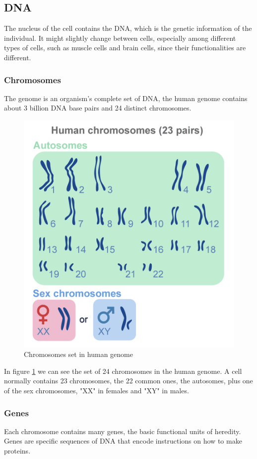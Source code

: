 \subsection{DNA}
The nucleus of the cell contains the DNA, which is the genetic information of the individual. It might slightly change between cells, especially among different types of cells, such as muscle cells and brain cells, since their functionalities are different.
\subsubsection{Chromosomes}
The genome is an organism's complete set of DNA, the human genome contains about 3 billion DNA base pairs and 24 distinct chromosomes. 

\begin{figure}[h]
	\includegraphics[scale=0.8]{res/proteins_overview/chromosomes.png}
	\caption{Chromosomes set in human genome}
	\label{fig:chromosomes}
\end{figure}

In figure \ref{fig:chromosomes} we can see the set of 24 chromosomes in the human genome. A cell normally contains 23 chromosomes, the 22 common ones, the autosomes, plus one of the sex chromosomes, "XX" in females and "XY" in males.
\subsubsection{Genes}
Each chromosome contains many genes, the basic functional units of heredity. Genes are specific sequences of DNA that encode instructions on how to make proteins.


